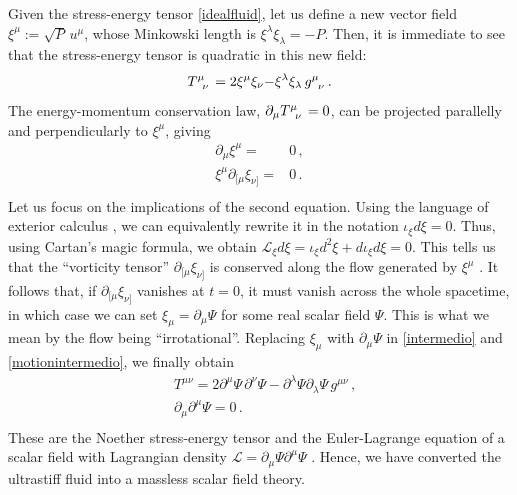 \documentclass[a4paper, amsfonts, amssymb, amsmath, reprint, showkeys, nofootinbib, twoside,notitlepage,onecolumn]{revtex4-2}
\theoremstyle{definition}
\theoremstyle{theorem}
\theoremstyle{corollary}
\begin{document}
Given the stress-energy tensor \eqref{idealfluid}, let us define a new vector field $\xi^\mu{:=} \sqrt{P} \, u^\mu$, whose Minkowski length is $\xi^\lambda \xi_\lambda {=}-P$. Then, it is immediate to see that the stress-energy tensor is quadratic in this new field:
\begin{equation}\label{intermedio}
    T\indices{^\mu _\nu}=2\xi^\mu \xi_\nu{-}\xi^\lambda \xi_\lambda \, g\indices{^\mu _\nu} \, .
\end{equation}
The energy-momentum conservation law, $\partial_\mu T\indices{^\mu _\nu}=0$, can be projected parallelly and perpendicularly to $\xi^\mu$, giving
\begin{equation}\label{motionintermedio}
\begin{split}
\partial_\mu \xi^\mu ={}& 0 \, ,\\  
\xi^\mu \partial_{[\mu} \xi_{\nu]}={}& 0 \, . \\
\end{split}
\end{equation}
Let us focus on the implications of the second equation. Using the language of exterior calculus \cite{LoringTubook}, we can equivalently rewrite it in the notation $\iota_\xi d\xi=0$. Thus, using Cartan's magic formula, we obtain $\mathcal{L}_\xi d\xi=\iota_\xi d^2 \xi+d\iota_\xi d\xi=0$. This tells us that the ``vorticity tensor'' $\partial_{[\mu} \xi_{\nu]}$ is conserved along the flow generated by $\xi^\mu$ \cite{noto_rel}. It follows that, if $\partial_{[\mu} \xi_{\nu]}$ vanishes at $t=0$, it must vanish across the whole spacetime, in which case we can set $\xi_\mu =\partial_\mu \Psi$ for some real scalar field $\Psi$. This is what we mean by the flow being ``irrotational''. Replacing $\xi_\mu$ with $\partial_\mu \Psi$ in \eqref{intermedio} and \eqref{motionintermedio}, we finally obtain
\begin{equation}
\begin{split}\label{psiuzzuzu}
& T^{\mu \nu}=2\partial^\mu \Psi \, \partial^\nu \Psi -\partial^\lambda \Psi \partial_\lambda \Psi \, g^{\mu \nu} \, , \\
& \partial_\mu \partial^\mu \Psi=0 \, . \\
\end{split}
\end{equation}
These are the Noether stress-energy tensor and the Euler-Lagrange equation of a scalar field with Lagrangian density $\mathcal{L}=\partial_\mu \Psi \partial^\mu \Psi$ \cite{carroll_2019}. Hence, we have converted the ultrastiff fluid into a massless scalar field theory.
\end{document}
